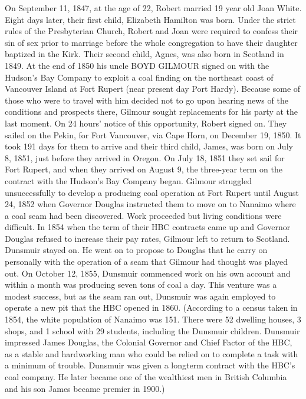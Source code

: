 On September 11, 1847, at the age of 22, Robert married 19 year old Joan White. Eight days later, their first child, Elizabeth Hamilton was born. Under the strict rules of the Presbyterian Church, Robert and Joan were required to confess their sin of sex prior to marriage before the whole congregation to have their daughter baptized in the Kirk. Their second child, Agnes, was also born in Scotland in 1849. At the end of 1850 his uncle \uppercase{Boyd Gilmour} signed on with the Hudson's Bay Company to exploit a coal finding on the northeast coast of Vancouver Island at Fort Rupert (near present day Port Hardy). Because some of those who were to travel with him decided not to go upon hearing news of the conditions and prospects there, Gilmour sought replacements for his party at the last moment. On 24 hours' notice of this opportunity, Robert signed on. They sailed on the Pekin, for Fort Vancouver, via Cape Horn, on December 19, 1850. It took 191 days for them to arrive and their third child, James, was born on July 8, 1851, just before they arrived in Oregon. On July 18, 1851 they set sail for Fort Rupert, and when they arrived on August 9, the three-year term on the contract with the Hudson's Bay Company began. Gilmour struggled unsuccessfully to develop a producing coal operation at Fort Rupert until August 24, 1852 when Governor Douglas instructed them to move on to Nanaimo where a coal seam had been discovered. Work proceeded but living conditions were difficult. In 1854 when the term of their HBC contracts came up and Governor Douglas refused to increase their pay rates, Gilmour left to return to Scotland. Dunsmuir stayed on. He went on to propose to Douglas that he carry on personally with the operation of a seam that Gilmour had thought was played out. On October 12, 1855, Dunsmuir commenced work on his own account and within a month was producing seven tons of coal a day. This venture was a modest success, but as the seam ran out, Dunsmuir was again employed to operate a new pit that the HBC opened in 1860.  (According to a census taken in 1854, the white population of Nanaimo was 151. There were 52 dwelling houses, 3 shops, and 1 school with 29 students, including the Dunsmuir children. Dunsmuir impressed James Douglas, the Colonial Governor and Chief Factor of the HBC, as a stable and hardworking man who could be relied on to complete a task with a minimum of trouble. Dunsmuir was given a longterm contract with the HBC’s coal company. He later became one of the wealthiest men in British Columbia and his son James became premier in 1900.)

